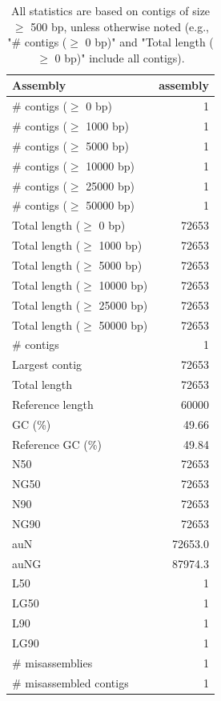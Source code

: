 \documentclass[12pt,a4paper]{article}
\begin{document}
\begin{table}[ht]
\begin{center}
\caption{All statistics are based on contigs of size $\geq$ 500 bp, unless otherwise noted (e.g., "\# contigs ($\geq$ 0 bp)" and "Total length ($\geq$ 0 bp)" include all contigs).}
\begin{tabular}{|l*{1}{|r}|}
\hline
Assembly & assembly \\ \hline
\# contigs ($\geq$ 0 bp) & 1 \\ \hline
\# contigs ($\geq$ 1000 bp) & 1 \\ \hline
\# contigs ($\geq$ 5000 bp) & 1 \\ \hline
\# contigs ($\geq$ 10000 bp) & 1 \\ \hline
\# contigs ($\geq$ 25000 bp) & 1 \\ \hline
\# contigs ($\geq$ 50000 bp) & 1 \\ \hline
Total length ($\geq$ 0 bp) & 72653 \\ \hline
Total length ($\geq$ 1000 bp) & 72653 \\ \hline
Total length ($\geq$ 5000 bp) & 72653 \\ \hline
Total length ($\geq$ 10000 bp) & 72653 \\ \hline
Total length ($\geq$ 25000 bp) & 72653 \\ \hline
Total length ($\geq$ 50000 bp) & 72653 \\ \hline
\# contigs & 1 \\ \hline
Largest contig & 72653 \\ \hline
Total length & 72653 \\ \hline
Reference length & 60000 \\ \hline
GC (\%) & 49.66 \\ \hline
Reference GC (\%) & 49.84 \\ \hline
N50 & 72653 \\ \hline
NG50 & 72653 \\ \hline
N90 & 72653 \\ \hline
NG90 & 72653 \\ \hline
auN & 72653.0 \\ \hline
auNG & 87974.3 \\ \hline
L50 & 1 \\ \hline
LG50 & 1 \\ \hline
L90 & 1 \\ \hline
LG90 & 1 \\ \hline
\# misassemblies & 1 \\ \hline
\# misassembled contigs & 1 \\ \hline

\end{tabular}
\end{center}
\end{table}
\end{document}
